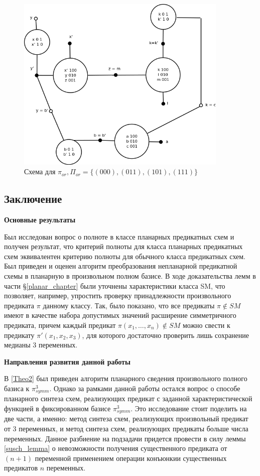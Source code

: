 \documentclass[12pt]{article}
\begin{document}
\begin{figure}[htb]
\centering
\includegraphics[width=0.9\textwidth]{min_or.png}
\caption{Схема для $\pi_{or}, \Pi_{or} = \{ (000), (011), (101), (111) \}$}
\label{fig:or}
\end{figure}

\clearpage
\subsection{Заключение}
\textbf{Основные результаты}

Был исследован вопрос о полноте в классе планарных предикатных схем и получен результат, что 
критерий полноты для класса планарных предикатных схем эквивалентен критерию полноты для обычного
класса предикатных схем. Был приведен и оценен алгоритм преобразования непланарной предикатной схемы в планарную 
в произвольном полном базисе. 
В ходе доказательства лемм в части \S \ref{planar_chapter} были уточнены характеристики класса SM, что 
позволяет, например, упростить проверку принадлежности произвольного предиката $\pi$ данному классу. 
Так, было показано, что все предикаты $\pi \notin SM$ имеют в качестве набора допустимых значений расширение симметричного
предиката, причем каждый предикат $\pi(x_1, \dots, x_n) \notin SM$ можно свести к предикату $\pi'(x_1, x_2, x_3)$, 
для которого достаточно проверить лишь сохранение медианы 3 переменных.

\textbf{Направления развития данной работы}

В \ref{Theo2} был приведен алгоритм планарного сведения произвольного полного базиса к $\pi_{symm}^3$.
Однако за рамками данной работы остался вопрос о способе планарного синтеза схем, реализующих предикат 
с заданной характеристической функцией в фиксированном базисе $\pi_{symm}^3$. 
Это исследование стоит поделить на две части, а именно: 
метод синтеза схем, реализующих произвольный предикат от 3 переменных, и метод синтеза схем, реализующих предикаты
больше числа переменных. Данное разбиение на подзадачи придется провести в силу леммы \ref{susch_lemma} о невозможности получения 
существенного предиката от $(n+1)$ переменной применением операции конъюнкии существенных предикатов $n$ переменных.
\end{document}
